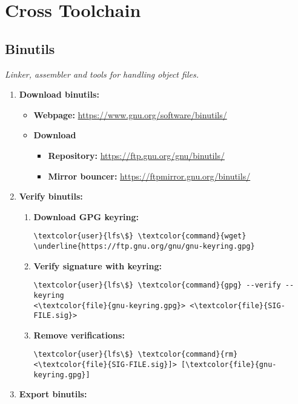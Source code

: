 \documentclass[10pt, a4paper, onecolumn, oneside, titlepage, openany]{book}
\begin{document}
\chapter{Cross Toolchain}
\section{Binutils}
\textit{Linker, assembler and tools for handling object files.}
\begin{enumerate}
    \item \textbf{Download binutils:}
    \begin{itemize}
        \item \textbf{Webpage:} \url{https://www.gnu.org/software/binutils/}
        \item \textbf{Download}
        \begin{itemize}
            \item \textbf{Repository:} \url{https://ftp.gnu.org/gnu/binutils/}
            \item \textbf{Mirror bouncer:} \url{https://ftpmirror.gnu.org/binutils/}
        \end{itemize}
    \end{itemize}
    \item \textbf{Verify binutils:}
    \begin{enumerate}
        \item \textbf{Download GPG keyring:}
\begin{Verbatim}[commandchars=\\\{\}]
\textcolor{user}{lfs\$} \textcolor{command}{wget} \underline{https://ftp.gnu.org/gnu/gnu-keyring.gpg}
\end{Verbatim}
        \item \textbf{Verify signature with keyring:}
\begin{Verbatim}[commandchars=\\\{\}]
\textcolor{user}{lfs\$} \textcolor{command}{gpg} --verify --keyring
<\textcolor{file}{gnu-keyring.gpg}> <\textcolor{file}{SIG-FILE.sig}>
\end{Verbatim}
        \item \textbf{Remove verifications:}
\begin{Verbatim}[commandchars=\\\{\}]
\textcolor{user}{lfs\$} \textcolor{command}{rm} <\textcolor{file}{SIG-FILE.sig}]> [\textcolor{file}{gnu-keyring.gpg}]
\end{Verbatim}
    \end{enumerate}
    \item \textbf{Export binutils:}

\end{enumerate}
\end{document}
